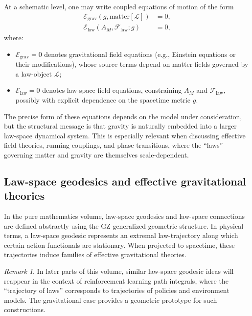\documentclass[11pt]{book}
\newcommand{\GZLOC}{\ensuremath{A_M}}
\newcommand{\GZLCurv}{\ensuremath{\mathcal{F}_{\mathrm{law}}}}
\theoremstyle{plain}
\theoremstyle{definition}
\theoremstyle{remark}
\newtheorem{remark}[theorem]{Remark}
\begin{document}
At a schematic level, one may write coupled equations of motion of the
form
\begin{align*}
   \mathcal{E}_{\mathrm{grav}}(g, \text{matter}[\mathcal{L}]) &= 0, \\
   \mathcal{E}_{\mathrm{law}}(\GZLOC, \GZLCurv; g) &= 0,
\end{align*}
where:
\begin{itemize}
  \item $\mathcal{E}_{\mathrm{grav}} = 0$ denotes gravitational field
        equations (e.g., Einstein equations or their modifications),
        whose source terms depend on matter fields governed by a
        law-object $\mathcal{L}$;
  \item $\mathcal{E}_{\mathrm{law}} = 0$ denotes law-space field
        equations, constraining $\GZLOC$ and $\GZLCurv$, possibly with
        explicit dependence on the spacetime metric $g$.
\end{itemize}

The precise form of these equations depends on the model under
consideration, but the structural message is that gravity is naturally
embedded into a larger law-space dynamical system. This is especially
relevant when discussing effective field theories, running couplings,
and phase transitions, where the ``laws'' governing matter and gravity
are themselves scale-dependent.

\subsection{Law-space geodesics and effective gravitational theories}

In the pure mathematics volume, law-space geodesics and law-space
connections are defined abstractly using the GZ generalized geometric
structure. In physical terms, a law-space geodesic represents an
extremal law-trajectory along which certain action functionals are
stationary. When projected to spacetime, these trajectories induce
families of effective gravitational theories.

\begin{remark}
  In later parts of this volume, similar law-space geodesic ideas will
  reappear in the context of reinforcement learning path integrals,
  where the ``trajectory of laws'' corresponds to trajectories of
  policies and environment models. The gravitational case provides a
  geometric prototype for such constructions.
\end{remark}
\end{document}
